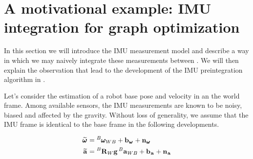 

  
\section{A motivational example: IMU integration for graph optimization}
In this section we will introduce the IMU measurement model and describe a way in which we may naively integrate these measurements between \keyframes.
We will then explain the observation that lead to the development of the IMU preintegration algorithm in \cite{lupton-09}.

Let's consider the estimation of a robot base pose and velocity in an the world frame. Among available sensors, the IMU measurements are known to be noisy, 
biased and affected by the gravity. Without loss of generality, we assume that the IMU frame is identical to the base frame in the following developments.

\begin{equation}
    \begin{split}
    \prescript{}{}{\widetilde{\pmb{\omega}}}_{} &= \prescript{B}{}{\pmb{\omega}}_{WB} + {\bf b}_{\prescript{}{}{\pmb{\omega}}_{}} + {\bf n}_{\prescript{}{}{\pmb{\omega}}_{}} 
    \\
    \prescript{}{}{\widetilde{{\bf a}}}_{}    &= \prescript{B}{}{{\bf R}}_{W} {\bf g} \prescript{B}{}{{\bf a}}_{WB} + {\bf b}_{\prescript{}{}{{\bf a}}_{}} + {\bf n}_{\prescript{}{}{{\bf a}}_{}} 
    \end{split}
    \label{eq:imu_meas_model}
\end{equation}
    
